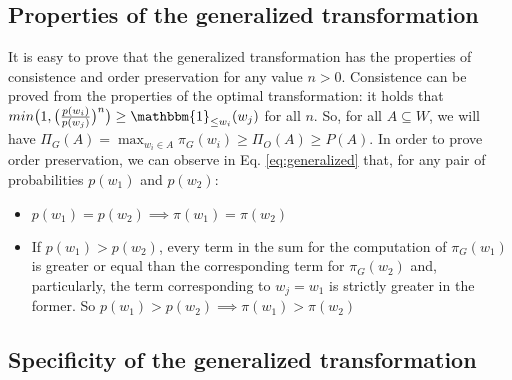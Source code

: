\documentclass[a4paper]{article}
\begin{document}
\subsection{Properties of the generalized transformation}
It is easy to prove that the generalized transformation has the properties of consistence and order preservation for any value $n > 0$. Consistence can be proved from the properties of the optimal transformation: it holds that $min\big(1,\big( \frac{p(w_i)}{p(w_j)} \big)^n \big)\geq \mathbbm{1}_{\leq w_i}(w_j) $ for all $n$. So, for all $A \subseteq W $, we will have $ \Pi_G(A)= \max_{w_i \in A}\pi_G(w_i) \geq \Pi_O(A) \geq P(A)$. In order to prove order preservation, we can observe in Eq. \ref{eq:generalized} that, for any pair of probabilities $p(w_1)$ and $p(w_2)$:
\begin{itemize}
\item $p(w_1) = p(w_2) \implies \pi(w_1) = \pi(w_2)$ 
\item If $p(w_1) > p(w_2)$, every term in the sum for the computation of $\pi_G(w_1)$ is greater or equal than the corresponding term for $\pi_G(w_2)$ and, particularly, the term corresponding to $w_j=w_1$ is strictly greater in the former. So $p(w_1) > p(w_2) \implies \pi(w_1) > \pi(w_2)$
\end{itemize}
\subsection{Specificity of the generalized transformation}
\end{document}
